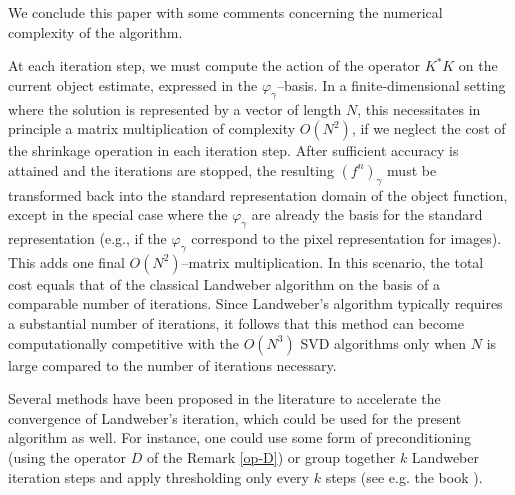 \documentclass[10pt]{article}
\def\g{\gamma}
\begin{document}
We conclude this paper with some comments
concerning the numerical complexity of the algorithm.

At each iteration step,
we must compute the action of the operator $K^*K$ on the current
object estimate, expressed in the $\varphi_{\gamma}$--basis.
In a finite-dimensional setting where the solution is
represented by a vector of length $N$, this necessitates in principle a
matrix multiplication
of complexity $O(N^2)$,
if we neglect the cost of the shrinkage operation in each iteration step.
After sufficient accuracy is attained and the iterations are stopped, the
resulting $(f^n)_{\gamma}$ must be transformed back into the standard
representation domain of the object function, except in the special case
where the $\varphi_{\g}$ are already the basis for the standard representation
(e.g., if the $\varphi_{\g}$ correspond to the pixel representation
for images). This adds one final $O(N^2)$--matrix multiplication. In this
scenario, the total cost equals that
of the classical Landweber algorithm
on the basis of a comparable number of iterations.
Since Landweber's algorithm typically requires a substantial number of
iterations, it follows that this method can become
computationally competitive with the $O(N^3)$ SVD algorithms only
when $N$ is large compared to the number of iterations necessary.

Several methods have been proposed in the literature to accelerate the
convergence
of Landweber's iteration, which could be used for the present algorithm as
well.
For instance, one could use some form of preconditioning (using the
operator $D$
of the Remark \ref{op-D}) or group together $k$ Landweber iteration steps and
apply thresholding only every $k$ steps (see e.g. the book \cite{Eng96}).
\end{document}
